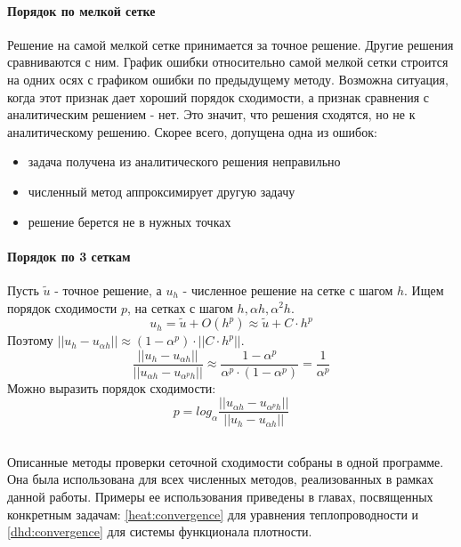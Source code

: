 \paragraph{Порядок по мелкой сетке}
Решение на самой мелкой сетке принимается за точное решение. Другие решения сравниваются с ним. График ошибки относительно самой мелкой сетки строится на одних осях с графиком ошибки по предыдущему методу. Возможна ситуация, когда этот признак дает хороший порядок сходимости, а признак сравнения с аналитическим решением - нет. Это значит, что решения сходятся, но не к аналитическому решению. Скорее всего, допущена одна из ошибок:
\begin{itemize}
\item задача получена из аналитического решения неправильно
\item численный метод аппроксимирует другую задачу
\item решение берется не в нужных точках
\end{itemize}

\paragraph{Порядок по 3 сеткам}
Пусть $\tilde u$ - точное решение, а $u_h$ - численное решение на сетке с шагом $h$. Ищем порядок сходимости $p$, на сетках с шагом $h, \alpha h, \alpha^2 h$.
\begin{equation}
u_h = \tilde u + O(h^p) \approx \tilde u + C \cdot h^p
\end{equation}
Поэтому $|| u_h - u_{\alpha h} || \approx (1 - \alpha^p) \cdot ||C \cdot h^p||$.
\begin{equation}
\frac {||u_h - u_{\alpha h}||} {||u_{\alpha h} - u_{\alpha^p h}||} \approx \frac {1 - \alpha^p} {\alpha^p \cdot (1 - \alpha^p)} = \frac{1}{\alpha^p}
\end{equation}
Можно выразить порядок сходимости: 
\begin{equation}
p = log_\alpha \frac {||u_{\alpha h} - u_{\alpha^p h}||} {||u_h - u_{\alpha h}||}
\end{equation}
\subsection*{}
Описанные методы проверки сеточной сходимости собраны в одной программе. Она была использована для всех численных методов, реализованных в рамках данной работы. Примеры ее использования приведены в главах, посвященных конкретным задачам: \ref{heat:convergence} для уравнения теплопроводности и \ref{dhd:convergence} для системы функционала плотности.

